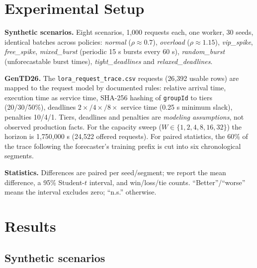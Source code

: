 \documentclass[conference]{IEEEtran}
\begin{document}
\section{Experimental Setup}

\textbf{Synthetic scenarios.} Eight scenarios, 1{,}000 requests each, one worker, 30 seeds, identical batches across policies: \emph{normal} ($\rho\approx0.7$), \emph{overload} ($\rho\approx1.15$), \emph{vip\_spike}, \emph{free\_spike}, \emph{mixed\_burst} (periodic 15 s bursts every 60 s), \emph{random\_burst} (unforecastable burst times), \emph{tight\_deadlines} and \emph{relaxed\_deadlines}.

\textbf{GenTD26.} The \texttt{lora\_request\_trace.csv} requests (26{,}392 usable rows) are mapped to the request model by documented rules: relative arrival time, execution time as service time, SHA-256 hashing of \texttt{groupId} to tiers (20/30/50\%), deadlines $2\times/4\times/8\times$ service time (0.25 s minimum slack), penalties 10/4/1. Tiers, deadlines and penalties are \emph{modeling assumptions}, not observed production facts. For the capacity sweep ($W\in\{1,2,4,8,16,32\}$) the horizon is 1{,}750{,}000 s (24{,}522 offered requests). For paired statistics, the 60\% of the trace following the forecaster's training prefix is cut into six chronological segments.

\textbf{Statistics.} Differences are paired per seed/segment; we report the mean difference, a 95\% Student-$t$ interval, and win/loss/tie counts. ``Better''/``worse'' means the interval excludes zero; ``n.s.'' otherwise.

\section{Results}

\subsection{Synthetic scenarios}

\begin{table}[t]
\caption{SLA violation rate, mean over 30 seeds (1 worker). Best per row in bold.}
\label{tab:syn_sla}
\centering\footnotesize

\end{table}

\begin{table}[t]
\caption{Penalty-weighted tardiness (seconds), mean over 30 seeds. Best per row in bold.}
\label{tab:syn_tard}
\centering\footnotesize

\end{table}
\end{document}
